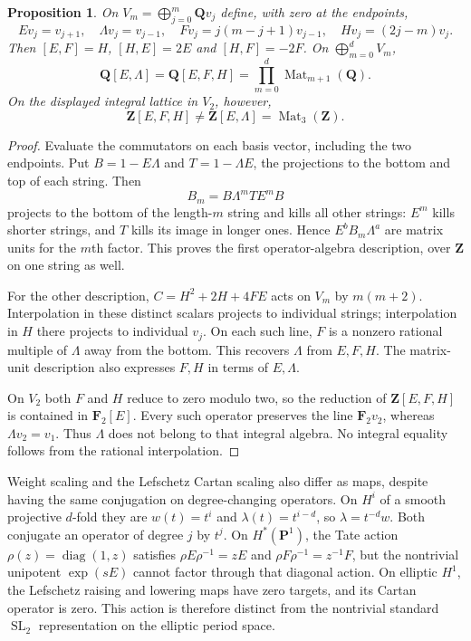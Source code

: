 \documentclass[11pt]{article}
\newtheorem{proposition}[theorem]{Proposition}
\theoremstyle{definition}\newtheorem{definition}[theorem]{Definition}
\theoremstyle{remark}\newtheorem{remark}[theorem]{Remark}
\newcommand{\Q}{\mathbf Q}\newcommand{\Z}{\mathbf Z}
\DeclareMathOperator{\SL}{SL}\DeclareMathOperator{\End}{End}
\begin{document}
\begin{proposition}\label{prop:lefschetz-integral}
On $V_m=\bigoplus_{j=0}^m\Q v_j$ define, with zero at the endpoints,
\[
 Ev_j=v_{j+1},\quad \Lambda v_j=v_{j-1},\quad
 Fv_j=j(m-j+1)v_{j-1},\quad Hv_j=(2j-m)v_j.
\]
Then $[E,F]=H$, $[H,E]=2E$ and $[H,F]=-2F$. On $\bigoplus_{m=0}^dV_m$,
\[
 \Q[E,\Lambda]=\Q[E,F,H]=\prod_{m=0}^d\operatorname{Mat}_{m+1}(\Q).
\]
On the displayed integral lattice in $V_2$, however,
\[
               \Z[E,F,H]\ne\Z[E,\Lambda]=\operatorname{Mat}_3(\Z).
\]
\end{proposition}
\begin{proof}
Evaluate the commutators on each basis vector, including the two endpoints. Put $B=1-E\Lambda$ and $T=1-\Lambda E$, the projections to the bottom and top of each string. Then
\[
                    B_m=B\Lambda^mTE^mB
\]
projects to the bottom of the length-$m$ string and kills all other strings: $E^m$ kills shorter strings, and $T$ kills its image in longer ones. Hence $E^bB_m\Lambda^a$ are matrix units for the $m$th factor. This proves the first operator-algebra description, over $\Z$ on one string as well.

For the other description, $C=H^2+2H+4FE$ acts on $V_m$ by $m(m+2)$. Interpolation in these distinct scalars projects to individual strings; interpolation in $H$ there projects to individual $v_j$. On each such line, $F$ is a nonzero rational multiple of $\Lambda$ away from the bottom. This recovers $\Lambda$ from $E,F,H$. The matrix-unit description also expresses $F,H$ in terms of $E,\Lambda$.

On $V_2$ both $F$ and $H$ reduce to zero modulo two, so the reduction of $\Z[E,F,H]$ is contained in $\mathbf F_2[E]$. Every such operator preserves the line $\mathbf F_2v_2$, whereas $\Lambda v_2=v_1$. Thus $\Lambda$ does not belong to that integral algebra. No integral equality follows from the rational interpolation.
\end{proof}

Weight scaling and the Lefschetz Cartan scaling also differ as maps, despite having the same conjugation on degree-changing operators. On $H^i$ of a smooth projective $d$-fold they are $w(t)=t^i$ and $\lambda(t)=t^{i-d}$, so $\lambda=t^{-d}w$. Both conjugate an operator of degree $j$ by $t^j$. On $H^*(\mathbf P^1)$, the Tate action $\rho(z)=\operatorname{diag}(1,z)$ satisfies $\rho E\rho^{-1}=zE$ and $\rho F\rho^{-1}=z^{-1}F$, but the nontrivial unipotent $\exp(sE)$ cannot factor through that diagonal action. On elliptic $H^1$, the Lefschetz raising and lowering maps have zero targets, and its Cartan operator is zero. This action is therefore distinct from the nontrivial standard $\SL_2$ representation on the elliptic period space.
\end{document}
